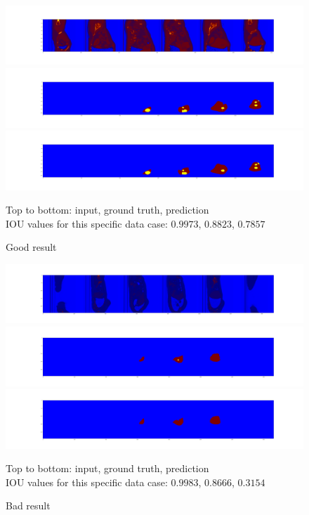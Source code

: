 \documentclass{article}
\begin{document}
		\begin{figure}[htbp]
		 	\centering
		 	\includegraphics[width=\textwidth]{good_input.png}\\
		 	\includegraphics[width=\textwidth]{good_target.png}\\
		 	\includegraphics[width=\textwidth]{good_predicted.png}
		 	\caption{Good result} Top to bottom: input, ground truth, prediction \\
		 	IOU values for this specific data case: $0.9973$, $0.8823$, $0.7857$

		 	\label{fig:good}
		\end{figure} 
		\begin{figure}[htbp]
		 	\centering
		 	\includegraphics[width=\textwidth]{bad_input.png}\\
		 	\includegraphics[width=\textwidth]{bad_target.png}\\
		 	\includegraphics[width=\textwidth]{bad_predicted.png}
		 	\caption{Bad result} Top to bottom: input, ground truth, prediction \\
		 	IOU values for this specific data case: $0.9983$, $0.8666$, $0.3154$
		 	\label{fig:bad}
		\end{figure} 
\end{document}
